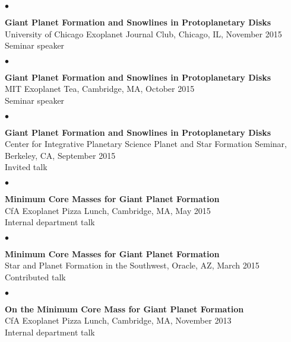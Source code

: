 \documentclass[margin,line]{res}
\newenvironment{list2}{
  \begin{list}{$\bullet$}{%
      \setlength{\itemsep}{0in}
      \setlength{\parsep}{0in} \setlength{\parskip}{0in}
      \setlength{\topsep}{0in} \setlength{\partopsep}{0in} 
      \setlength{\leftmargin}{0.2in}}}{\end{list}}
\begin{document}
\begin{resume}
\begin{list2}
\item[] {\bf Giant Planet Formation and Snowlines in Protoplanetary Disks} \\
University of Chicago Exoplanet Journal Club, Chicago, IL, November 2015 \\
Seminar speaker \\
\end{list2}

\begin{list2}
\item[] {\bf Giant Planet Formation and Snowlines in Protoplanetary Disks} \\
MIT Exoplanet Tea, Cambridge, MA, October 2015 \\
Seminar speaker \\
\end{list2}

\begin{list2}
\item[] {\bf Giant Planet Formation and Snowlines in Protoplanetary Disks} \\
Center for Integrative Planetary Science Planet and Star Formation Seminar, Berkeley, CA, September 2015 \\
Invited talk \\
\end{list2}

\begin{list2}
\item[] {\bf Minimum Core Masses for Giant Planet Formation} \\
CfA Exoplanet Pizza Lunch, Cambridge, MA, May 2015  \\
Internal department talk \\
\end{list2}

\begin{list2}
\item[] {\bf Minimum Core Masses for Giant Planet Formation} \\
Star and Planet Formation in the Southwest, Oracle, AZ, March 2015  \\
Contributed talk \\
\end{list2}

\begin{list2}
\item[] {\bf On the Minimum Core Mass for Giant Planet Formation} \\
CfA Exoplanet Pizza Lunch, Cambridge, MA, November 2013  \\
Internal department talk \\
\end{list2}


\end{resume}
\end{document}

